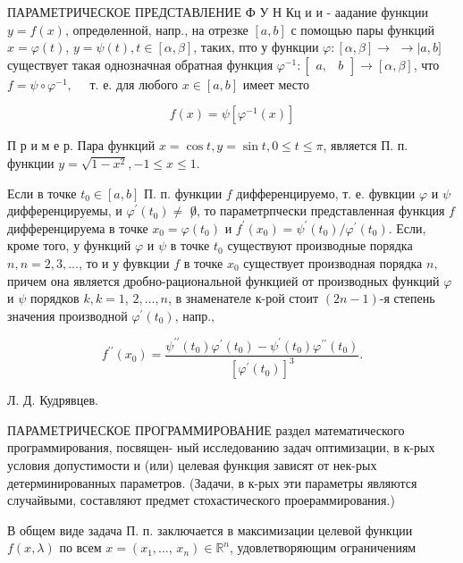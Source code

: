 \documentclass[10pt]{article}
\begin{document}
ПАРАМЕТРИЧЕСКОЕ ПРЕДСТАВЛЕНИЕ Ф У Н Кц и и - аадание функции $y=f(x)$, опредөленной, напр., на отрезке $[a, b]$ с помощью пары функций $x=\varphi(t)$, $y=\psi(t), t \in[\alpha, \beta]$, таких, пто у функции $\varphi:[\alpha, \beta] \rightarrow$ $\rightarrow \mid a, b]$ существует такая однозначная обратная функция $\varphi^{-1}:\left[\begin{array}{ll}a, & b\end{array}\right] \rightarrow[\alpha, \beta]$, что $f=\psi \circ \varphi^{-1}, \quad$ т. $е$. для любого $x \in[a, b]$ имеет место

\[
f(x)=\psi\left[\varphi^{-1}(x)\right]
\]

П р и м е р. Пара функций $x=\cos t, y=\sin t, 0 \leqslant t \leqslant \pi$, является П. п. функции $y=\sqrt{1-x^{2}},-1 \leqslant x \leqslant 1$.

Если в точке $t_{0} \in[a, b]$ П. п. функции $f$ дифференцируемо, т. е. фувкции $\varphi$ и $\psi$ дифференцируемы, и $\varphi^{\prime}\left(t_{0}\right) \neq$ $\not 0$, то параметрпчески представленная функция $f$ дифференцируема в точке $x_{0}=\varphi\left(t_{0}\right)$ и $f^{\prime}\left(x_{0}\right)=\psi^{\prime}\left(t_{0}\right) / \varphi^{\prime}\left(t_{0}\right)$. Если, кроме того, у функций $\varphi$ и $\psi$ в точке $t_{0}$ существуют производные порядка $n, n=2,3, \ldots$, то и у фувкции $f$ в точке $x_{0}$ существует производная порядка $n$, причем она является дробно-рациональной функцией от производных функций $\varphi$ и $\psi$ порядков $k, k=1$, $2, \ldots, n$, в знаменателе к-рой стоит $(2 n-1)$-я степень значения производной $\varphi^{\prime}\left(t_{0}\right)$, напр.,

\[
f^{\prime \prime}\left(x_{0}\right)=\frac{\psi^{\prime \prime}\left(t_{0}\right) \varphi^{\prime}\left(t_{0}\right)-\psi^{\prime}\left(t_{0}\right) \varphi^{\prime \prime}\left(t_{0}\right)}{\left[\varphi^{\prime}\left(t_{0}\right)\right]^{3}} .
\]

Л. Д. Кудрявцев.

ПАРАМЕТРИЧЕСКОЕ ПРОГРАММИРОВАНИЕ раздел математического программирования, посвящен- ный исследованию задач оптимизации, в к-рых условия допустимости и (или) целевая функция зависят от нек-рых детерминированных параметров. (Задачи, в к-рых эти параметры являются случайвыми, составляют предмет стохастического проераммирования.)

В общем виде задача П. п. заключается в максимизации целевой функции $f(x, \lambda)$ по всем $x=\left(x_{1}, \ldots\right.$, $\left.x_{n}\right) \in \mathbb{R}^{n}$, удовлетворяющим ограничениям
\end{document}
